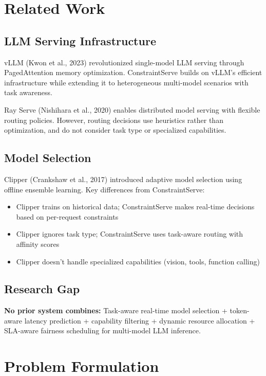 \documentclass[11pt]{article}
\begin{document}
\section{Related Work}

\subsection{LLM Serving Infrastructure}

vLLM (Kwon et al., 2023) revolutionized single-model LLM serving through PagedAttention memory optimization. ConstraintServe builds on vLLM's efficient infrastructure while extending it to heterogeneous multi-model scenarios with task awareness.

Ray Serve (Nishihara et al., 2020) enables distributed model serving with flexible routing policies. However, routing decisions use heuristics rather than optimization, and do not consider task type or specialized capabilities.

\subsection{Model Selection}

Clipper (Crankshaw et al., 2017) introduced adaptive model selection using offline ensemble learning. Key differences from ConstraintServe:
\begin{itemize}
    \item Clipper trains on historical data; ConstraintServe makes real-time decisions based on per-request constraints
    \item Clipper ignores task type; ConstraintServe uses task-aware routing with affinity scores
    \item Clipper doesn't handle specialized capabilities (vision, tools, function calling)
\end{itemize}

\subsection{Research Gap}

\textbf{No prior system combines:} Task-aware real-time model selection + token-aware latency prediction + capability filtering + dynamic resource allocation + SLA-aware fairness scheduling for multi-model LLM inference.

\section{Problem Formulation}
\end{document}
